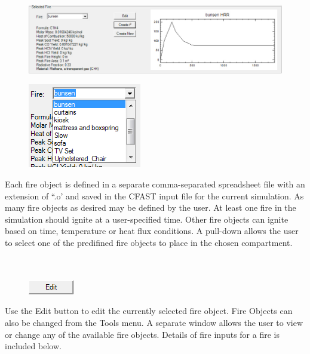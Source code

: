 \begin{figure}[h!]
\begin{center}
\includegraphics[width=6.5in]{FIGURES/Input_File/Fire_Object_Plot}
\end{center}
\end{figure}


\begin{figure}
  \includegraphics[width=1.948in]{FIGURES/Input_File/Fire_Pulldown}
\end{figure}

Each fire object is defined in a separate comma-separated spreadsheet file with an extension of ``.o' and saved in the CFAST input file for the current simulation. As many fire objects as desired may be defined by the user.  At least one fire in the simulation should ignite at a user-specified time.  Other fire objects can ignite based on time, temperature or heat flux conditions. A pull-down allows the user to select one of the predifined fire objects to place in the chosen compartment. \\~ \\~ \\

\begin{figure}
  \includegraphics[width=0.781in]{FIGURES/Input_File/Edit_Button}
\end{figure}

Use the Edit button to edit the currently selected fire object. Fire Objects can also be changed from the Tools menu. A separate window allows the user to view or change any of the available fire objects. Details of fire inputs for a fire is included below.

